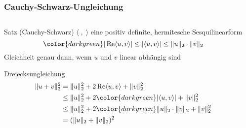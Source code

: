 %
%
%
\bgroup
{}
\begin{frame}[t]
\setlength{\abovedisplayskip}{5pt}
\setlength{\belowdisplayskip}{5pt}
\frametitle{Cauchy-Schwarz-Ungleichung}
\vspace{-15pt}
\begin{columns}[t,onlytextwidth]
\begin{column}{0.48\textwidth}
\begin{block}{Satz (Cauchy-Schwarz)}
$\langle\;,\;\rangle$ eine positiv definite, hermitesche Sesquilinearform
\[
{\color{darkgreen}
|\operatorname{Re}\langle u,v\rangle|
\le
|\langle u,v\rangle|
\le
\|u\|_2\cdot \|v\|_2
}
\]
Gleichheit genau dann, wenn $u$ und $v$ linear abhängig sind
\end{block}
\begin{block}{Dreiecksungleichung}
\vspace{-12pt}
\begin{align*}
\|u+v\|_2^2
&=
\|u\|_2^2 + 2\operatorname{Re}\langle u,v\rangle + \|v\|_2^2
\\
&\le
\|u\|_2^2 + 2{\color{darkgreen}|\langle u,v\rangle|} + \|v\|_2^2
\\
&\le
\|u\|_2^2 + 2{\color{darkgreen}\|u\|_2\cdot \|v\|_2} + \|v\|_2^2
\\
&=(\|u\|_2 + \|v\|_2)^2
\end{align*}
\end{block}
\end{column}
\begin{column}{0.48\textwidth}
\end{column}
\end{columns}
\end{frame}
\egroup
